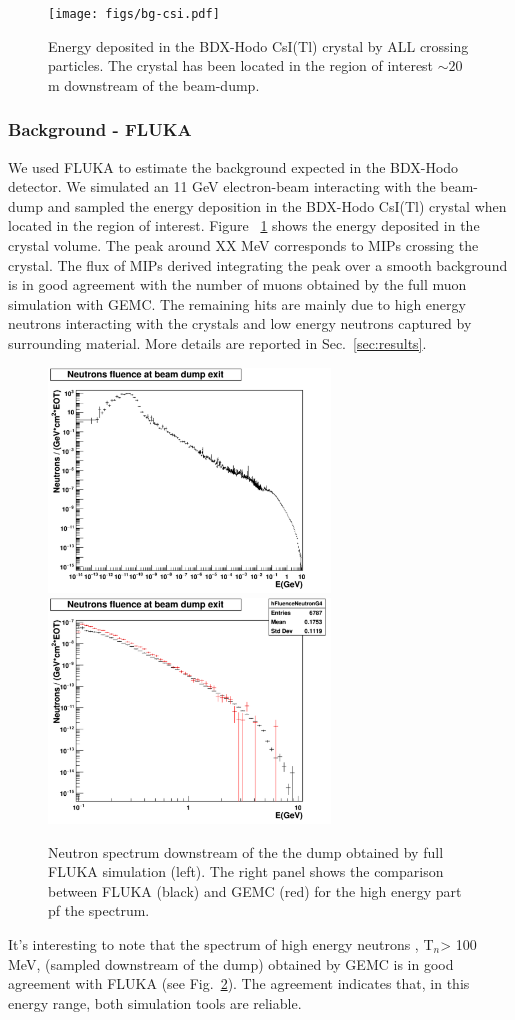 \begin{figure}[h!] 
\center
\texttt{[image: figs/bg-csi.pdf]}   
\caption{Energy deposited in the BDX-Hodo CsI(Tl) crystal by ALL crossing particles. The crystal has been located in the region of interest $\sim 20$ m downstream of the beam-dump. }
\label{fig:bg-csi}
\end{figure}

\subsubsection{Background - FLUKA}
We used FLUKA to estimate the background expected in the BDX-Hodo detector.
We simulated an 11 GeV electron-beam interacting with the beam-dump   and sampled the energy deposition in the BDX-Hodo CsI(Tl) crystal when located in the region of interest. 
Figure ~\ref{fig:bg-csi} shows the energy deposited in the crystal volume. The peak around XX MeV corresponds to MIPs crossing the crystal. The flux of MIPs derived  integrating the peak over a smooth background is in good agreement with the number of muons obtained by the full muon simulation with  GEMC. The remaining hits are mainly due to high energy neutrons interacting with the crystals and low energy neutrons captured by surrounding material. More details are reported in Sec.~\ref{sec:results}.
\begin{figure}[h!] 
\center
\includegraphics[width=7.5cm]{figs/NeutronsDump_1D.pdf}    
\includegraphics[width=7.5cm]{figs/NeutronsDumpComparison_1D.pdf}   
\caption{Neutron spectrum downstream of the the dump obtained by full FLUKA simulation (left). The right panel shows  the comparison between FLUKA (black) and GEMC (red) for the high energy part pf the spectrum.}
\label{fig:n-comp}
\end{figure}
It's interesting to note that the spectrum of  high energy neutrons , T$_n$> 100 MeV,  (sampled downstream of the dump)  obtained by GEMC is in good agreement with FLUKA (see Fig.~\ref{fig:n-comp}). The agreement indicates  that, in this energy range, both simulation tools are reliable. 

